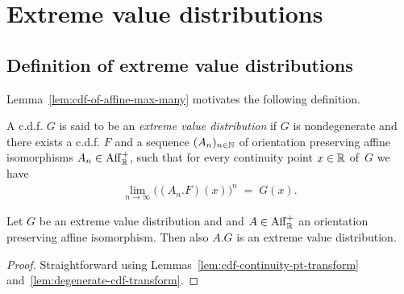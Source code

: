 %

\chapter{Extreme value distributions}

\section{Definition of extreme value distributions}

Lemma~\ref{lem:cdf-of-affine-max-many} motivates the following definition.

\begin{definition}
  \label{def:extr-val-distr}
  \leanok
  A c.d.f. $G$ is said to be an \emph{extreme value distribution} if
  $G$ is nondegenerate and
  there exists a c.d.f. $F$ and a sequence $(A_n)_{n \in \mathbb{N}}$ of orientation
  preserving affine isomorphisms $A_n \in \mathrm{Aff}^+_{\mathbb{R}}$, such that
  for every continuity point $x \in \mathbb{R}$ of~$G$ we have
  \begin{align*}
  \lim_{n \to \infty} \big( (A_n.F)(x) \big)^n \; = \; G(x) .
  \end{align*}
\end{definition}

\begin{lemma}
  \label{lem:extr-val-distr-transform}
  \leanok
  Let $G$ be an extreme value distribution and
  and $A \in \mathrm{Aff}^+_{\mathbb{R}}$ an orientation preserving affine isomorphism.
  Then also $A.G$ is an extreme value distribution.
\end{lemma}
\begin{proof}
  Straightforward using Lemmas~\ref{lem:cdf-continuity-pt-transform}
  and~\ref{lem:degenerate-cdf-transform}.
\end{proof}



